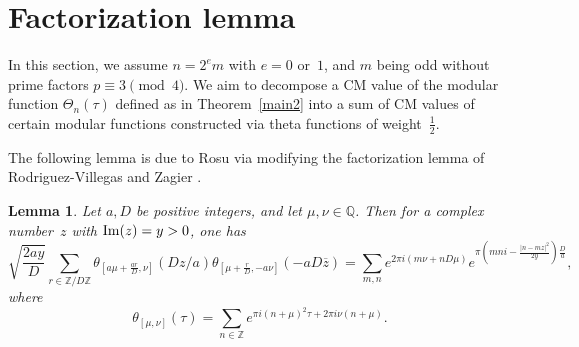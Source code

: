 \documentclass[11pt, reqno]{amsart}
\theoremstyle{plain}
\newtheorem{lemma}[theorem]{Lemma}
\theoremstyle{definition}
\newtheorem{example}[theorem]{Example}
\numberwithin{equation}{section}
\begin{document}





\section{Factorization lemma}\label{factorlem}

In this section, we assume $n=2^{e}m$ with $e=0$ or~$1$, and $m$ being odd without prime factors $p\equiv3\pmod{4}$. We aim to decompose a CM value of the modular function $\Theta_{n}(\tau)$ defined as in Theorem~\ref{main2} into a sum of CM values of certain modular functions constructed via theta functions of weight~$\frac{1}{2}$. 

The following lemma is due to Rosu \cite{R} via modifying the  factorization lemma of Rodriguez-Villegas and Zagier \cite{V2}.


\begin{lemma}\label{rosulem}
Let $a,D$ be positive integers, and let $\mu,\nu\in\mathbb{Q}$. Then for a complex number~$z$ with ${\rm Im}(z)=y>0$, one has
    $$
\sqrt{\frac{2ay}{D}}    \sum_{r\in\mathbb{Z}/D\mathbb{Z}}\theta_{[a\mu+\frac{ar}{D},\nu]}(Dz/a)\theta_{[\mu+\frac{r}{D},-a\nu]}(-aD\overline{z})=\sum_{m,n}e^{2\pi i(m\nu+nD\mu)}e^{\pi(mni-\frac{|n-mz|^{2}}{2y})\frac{D}{a}},
    $$
    where
    $$
    \theta_{[\mu,\nu]}(\tau)=\sum_{n\in\mathbb{Z}}e^{\pi i(n+\mu)^{2}\tau+2\pi i\nu (n+\mu)}.
    $$
\end{lemma}
\end{document}
